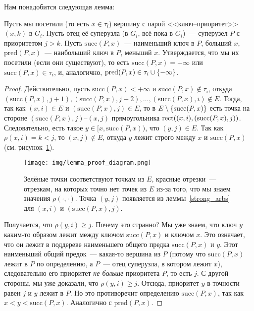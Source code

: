 Нам понадобится следующая лемма:

\begin{lemma}\label{visited_parent}
	Пусть мы посетили (то есть $x \in \tau_i$) вершину с парой <<ключ--приоритет>> $(x, k)$ в $G_i$. Пусть отец её суперузла (в $G_i$, всё пока в $G_i$)~--- суперузел $P$ с приоритетом $j > k$.
	Пусть $\mathrm{succ}(P, x)$~--- наименьший ключ в $P$, больший $x$, $\mathrm{pred}(P, x)$~--- наибольший ключ в $P$, меньший $x$.
	Утверждается, что мы их посетили (если они существуют), то есть $\mathrm{succ}(P, x) = +\infty$ или $\mathrm{succ}(P, x) \in \tau_i$, и, аналогично, $\mathrm{pred}(P, x) \in \tau_i \cup \lbrace-\infty\rbrace$.
\end{lemma}
\begin{proof}
	Действительно, пусть $\mathrm{succ}(P, x) < +\infty$ и $\mathrm{succ}(P, x) \notin \tau_i$, откуда $(\mathrm{succ}(P, x), j + 1), (\mathrm{succ}(P, x), j + 2), \ldots, (\mathrm{succ}(P, x), i) \notin E$. Тогда, так как $(x, i) \in E$ и $(\mathrm{succ}(P, x), j) \in E$, то в $E \setminus \lbrace\mathrm{succ}(P, x)\rbrace$ есть точка на стороне $(\mathrm{succ}(P, x), j)$--$(x,j)$ прямоугольника $\operatorname{rect}((x, i), (\mathrm{succ}(P, x), j))$. Следовательно, есть такое $y \in [x, \mathrm{succ}(P, x))$, что $(y, j) \in E$. Так как $\rho(x, i) = k < j$, то $(x, j) \notin E$, откуда $y$ лежит строго между $x$ и $\mathrm{succ}(P, x)$ (см. рисунок~\ref{proof_diagram}).

	\begin{figure} \centering
		\texttt{[image: img/lemma\_proof\_diagram.png]}

		\caption{Зелёные точки соответствуют точкам из $E$, красные отрезки~--- отрезкам, на которых точно нет точек из $E$ из-за того, что мы знаем значения
			$\rho(\cdot, \cdot)$. Точка $(y, j)$ появляется из леммы~\ref{strong_arbs} для $(x, i)$ и
			$(\mathrm{succ}(P, x), j)$.}
		\label{proof_diagram}
	\end{figure}

	Получается, что $\rho(y, i) \geqslant j$. Почему это странно? Мы уже знаем, что ключ $y$ каким-то образом лежит между ключом $\mathrm{succ}(P, x)$ и ключом $x$. Это означает, что он лежит в поддереве наименьшего общего предка
	$\mathrm{succ}(P, x)$ и $y$. Этот наименьший общий предок~--- какая-то вершина из $P$ (потому что $\mathrm{succ}(P, x)$ лежит в $P$ по определению, а $P$~--- отец суперузла, в котором лежит $x$), следовательно его приоритет \emph{не больше} приоритета $P$, то есть $j$. С другой стороны, мы уже доказали, что $\rho(y, i) \geqslant j$. Отсюда, приоритет $y$ в точности равен $j$ и $y$ лежит в $P$. Но это противоречит определению $\mathrm{succ}(P, x)$, так как $x < y < \mathrm{succ}(P, x)$. Аналогично с $\mathrm{pred}(P, x)$.

\end{proof}

